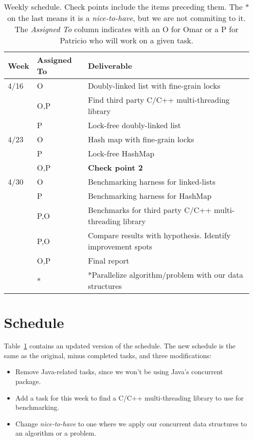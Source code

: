 \documentclass[11pt]{article}
\begin{document}
\begin{table}[t]
\begin{center}
\begin{tabular}{lll}
\toprule
\bf Week & \bf Assigned To  & \bf Deliverable   \\
\midrule
4/16     & O     & Doubly-linked list with fine-grain locks \\
         & O,P   & Find third party C/C++ multi-threading library \\
         & P     & Lock-free doubly-linked list \\
4/23     & O     & Hash map with fine-grain locks \\
         & P     & Lock-free HashMap \\ 
         & O,P   & {\bf Check point 2} \\   
4/30     & O     & Benchmarking harness for linked-lists \\
         & P     & Benchmarking harness for HashMap \\
         & P,O   & Benchmarks for third party C/C++ multi-threading library \\
         & P,O   & Compare results with hypothesis. Identify improvement spots \\
         & O,P   & Final report \\
         & *     & *Parallelize algorithm/problem with our data structures \\
\bottomrule
\end{tabular}
\caption{
Weekly schedule. Check points include the items preceding them. The * on the
last means it is a {\it nice-to-have}, but we are not commiting to it.
The {\it Assigned To} column indicates with an O for Omar or a P for Patricio
who will work on a given task.
}
\label{table:sche}
\end{center}
\end{table}

\section*{Schedule}
Table~\ref{table:sche} contains an updated version of the schedule. The new
schedule is the same as the original, minus completed tasks, and three
modifications:

\begin{itemize}
\item
Remove Java-related tasks, since we won't be using Java's concurrent package.
\item
Add a task for this week to find a C/C++ multi-threading library to use for
benchmarking.
\item
Change {\it nice-to-have} to one where we apply our concurrent data structures
to an algorithm or a problem.
\end{itemize}
\end{document}
